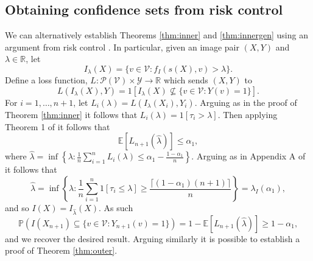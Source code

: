 \subsection{Obtaining confidence sets from risk control}\label{risk2con}
We can alternatively establish Theorems \ref{thm:inner} and \ref{thm:innergen} using an argument from risk control \citep{Angelopoulos2022}. In particular, given an image pair $(X,Y)$ and $\lambda \in \mathbb{R}$, let $$I_\lambda(X) =  \lbrace v \in \mathcal{V}: f_I(s(X), v) > \lambda \rbrace.$$ Define a loss function, $L:\mathcal{P}(\mathcal{V}) \times \mathcal{Y} \rightarrow \mathbb{R}$ which sends $(X,Y)$ to 
\begin{equation*}
	L(I_\lambda(X), Y) = 1\left[ I_\lambda(X) \not \subseteq\lbrace v\in \mathcal{V}: Y(v) = 1 \rbrace \right].
\end{equation*}
For $i = 1, \dots, n + 1$, let 	$L_i(\lambda) = 	L(I_\lambda(X_i), Y_i)$. Arguing as in the proof of Theorem \ref{thm:inner} it follows that $L_i(\lambda) = 1[\tau_i > \lambda]$. Then applying Theorem 1 of \cite{Angelopoulos2022} it follows that 
\begin{equation*}
	\mathbb{E}\left[ L_{n+1}(\hat{\lambda})\right] \leq \alpha_1,
\end{equation*}
where $\hat{\lambda} = \inf\left\lbrace \lambda: \frac{1}{n}\sum_{i = 1}^n L_i(\lambda) \leq \alpha_1 - \frac{1-\alpha_1}{n}\right\rbrace$. Arguing as in Appendix A of \citep{Angelopoulos2022} it follows that 
	\begin{equation*}
	\hat{\lambda} = \inf\left\lbrace \lambda: \frac{1}{n} \sum_{i = 1}^n 1\left[ \tau_i\leq \lambda \right] \geq \frac{\lceil (1-\alpha_1)(n+1) \rceil}{n}\right\rbrace = \lambda_I(\alpha_1),
\end{equation*}
and so $I(X) = I_{\hat{\lambda}}(X)$. As such 	
\begin{equation}\label{eq:probstat2}
	\mathbb{P}\left( I(X_{n+1}) \subseteq\lbrace v\in \mathcal{V}: Y_{n+1}(v) = 1 \rbrace \right) = 1 - \mathbb{E}\left[ L_{n+1}(\hat{\lambda})\right]  \geq 1 - \alpha_1, 
\end{equation}
and we recover the desired result. Arguing similarly it is possible to establish a proof of Theorem \ref{thm:outer}.


